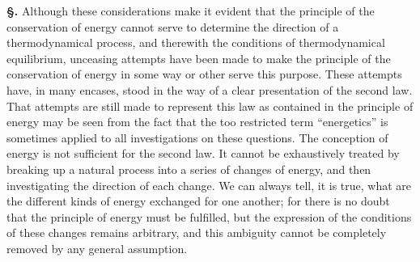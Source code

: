 \documentclass[12pt]{book}[2005/09/16]
\newcommand{\Erratum}[2]{#2}
\newcommand{\Section}[1]{
  \medskip\par\textbf{§\;#1}
  \label{section:#1}
}
\newcommand{\PageSep}[1]{\ignorespaces}
\begin{document}
\Section{108.} Although these considerations make it evident
that the principle of the conservation of energy cannot
serve to determine the direction of a thermodynamical
process, and therewith the conditions of thermodynamical
equilibrium, unceasing attempts have been made to make
the principle of the conservation of energy in some way or
other serve this purpose. These attempts have, in many
encases, stood in the way of a clear presentation of the second
law. \Erratum{Occasionally we still find the endeavour made to
represent this law as contained in the energy principle, in
that the doubtless too restricted term of ``energetics'' is
\index{Energetics}%
applied to all investigations on these questions.}{That attempts
are still made to represent this law as contained in the principle
of energy may be seen from the fact that the too restricted term
\index{Energetics}%
``energetics'' is sometimes applied to all investigations on these
questions.}
The conception
of energy is not sufficient for the second law. It
cannot be exhaustively treated by breaking up a natural
process into a series of changes of energy, and then investigating
the direction of each change. We can always
tell, it is true, what are the different kinds of energy
exchanged for one another; for there is no doubt that the
principle of energy must be fulfilled, but the expression of
\PageSep{80}
the conditions of these changes remains arbitrary, and
this ambiguity cannot be completely removed by any
general assumption.
\end{document}
